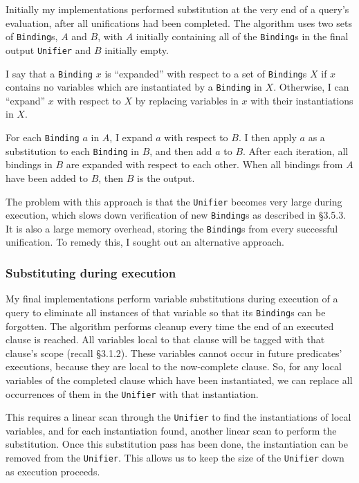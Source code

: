 \documentclass[12pt]{article}
\begin{document}
Initially my implementations performed substitution at the very end of a query's evaluation, after all unifications had been completed. 
The algorithm uses two sets of \verb|Binding|s, $A$ and $B$, with $A$ initially containing all of the \verb|Binding|s in the final output \verb|Unifier| and $B$ initially empty.

I say that a \verb|Binding| $x$ is ``expanded'' with respect to a set of \verb|Binding|s $X$ if $x$ contains no variables which are instantiated by a \verb|Binding| in $X$. 
Otherwise, I can ``expand'' $x$ with respect to $X$ by replacing variables in $x$ with their instantiations in $X$.

For each \verb|Binding| $a$ in $A$, I expand $a$ with respect to $B$. 
I then apply $a$ as a substitution to each \verb|Binding| in $B$, and then add $a$ to $B$. 
After each iteration, all bindings in $B$ are expanded with respect to each other. 
When all bindings from $A$ have been added to $B$, then $B$ is the output.

The problem with this approach is that the \verb|Unifier| becomes very large during execution, which slows down verification of new \verb|Binding|s as described in \S3.5.3. 
It is also a large memory overhead, storing the \verb|Binding|s from every successful unification.
To remedy this, I sought out an alternative approach.

\subsubsection{Substituting during execution}

My final implementations perform variable substitutions during execution of a query to eliminate all instances of that variable so that its \verb|Binding|s can be forgotten.
The algorithm performs cleanup every time the end of an executed clause is reached.
All variables local to that clause will be tagged with that clause's scope (recall \S3.1.2).
These variables cannot occur in future predicates' executions, because they are local to the now-complete clause.
So, for any local variables of the completed clause which have been instantiated, we can replace all occurrences of them in the \verb|Unifier| with that instantiation. 

This requires a linear scan through the \verb|Unifier| to find the instantiations of local variables, and for each instantiation found, another linear scan to perform the substitution.
Once this substitution pass has been done, the instantiation can be removed from the \verb|Unifier|.
This allows us to keep the size of the \verb|Unifier| down as execution proceeds.
\end{document}
